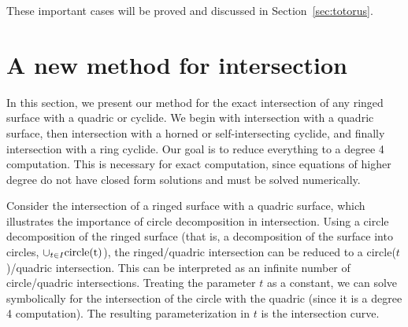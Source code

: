These important cases will be proved and discussed in 
Section~\ref{sec:totorus}.


% 

\section{A new method for intersection}
\label{sec:nim}


In this section, we present our method for the exact intersection of any
ringed surface with a quadric or cyclide.
%
% 
We begin with intersection with a quadric surface, then intersection with
a horned or self-intersecting cyclide, and finally intersection with a ring
cyclide.
Our goal is to reduce everything to a degree 4 computation.
This is necessary for exact computation, since equations of higher degree
do not have closed form solutions \cite{He75} 
and must be solved numerically.

Consider the intersection of a ringed surface with a quadric surface,
which illustrates the importance of circle decomposition in intersection.
Using a circle decomposition of the ringed surface 
(that is, a decomposition of the surface into circles, 
$\cup_{t \in I} \rm{circle}(t)$),
the ringed/quadric intersection can be reduced
to a circle($t$)/quadric intersection.
This can be interpreted as an infinite number of circle/quadric intersections.
Treating the parameter $t$ as a constant,
we can solve symbolically for the intersection of the circle with the quadric
(since it is a degree 4 computation).
The resulting parameterization in $t$ is the intersection curve.


